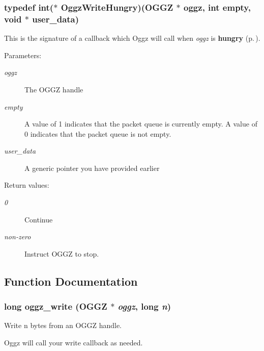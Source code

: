 \subsubsection{\setlength{\rightskip}{0pt plus 5cm}typedef int($\ast$ {\bf Oggz\-Write\-Hungry})({\bf OGGZ} $\ast$ oggz, int empty, void $\ast$ user\_\-data)}\label{group__write__api_ga0}


This is the signature of a callback which Oggz will call when {\em oggz\/} is {\bf hungry }{\rm (p.\,\pageref{group__hungry})}. 

\begin{Desc}
\item[Parameters:]
\begin{description}
\item[{\em oggz}]The OGGZ handle \item[{\em empty}]A value of 1 indicates that the packet queue is currently empty. A value of 0 indicates that the packet queue is not empty. \item[{\em user\_\-data}]A generic pointer you have provided earlier \end{description}
\end{Desc}
\begin{Desc}
\item[Return values:]
\begin{description}
\item[{\em 0}]Continue \item[{\em non-zero}]Instruct OGGZ to stop. \end{description}
\end{Desc}


\subsection{Function Documentation}
\subsubsection{\setlength{\rightskip}{0pt plus 5cm}long oggz\_\-write ({\bf OGGZ} $\ast$ {\em oggz}, long {\em n})}\label{group__write__api_ga4}


Write n bytes from an OGGZ handle. 

Oggz will call your write callback as needed.

